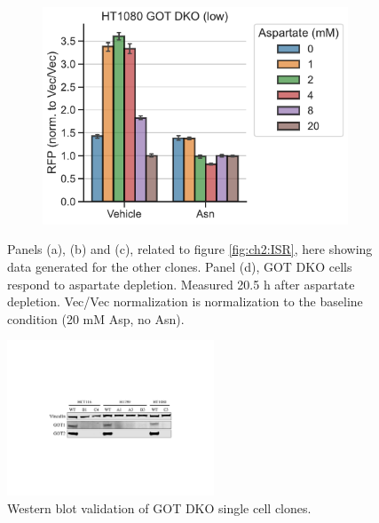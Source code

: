 \begin{figure}[ht]
\begin{subfigure}[b]{0.4\textwidth}
         \caption{}
         \label{fig:app_ch2:HT1080_Atp_ATF4rep}
     \end{subfigure}
     \hspace{0.06\textwidth}
     \begin{subfigure}[b]{0.4\textwidth}
         \includegraphics[width=\textwidth]{figures/chap2/app/HT1080_GOT_DKO_Asp_ATF4rep.pdf}
         \caption{}
         \label{fig:app_ch2:HT1080_GOT_DKO_Asp_ATF4rep}
     \end{subfigure}
        \caption[Mito inhibitor induced ATF4 is rescued by Asn, other clones.]{
        Panels (a), (b) and (c), related to figure \ref{fig:ch2:ISR}, here showing data generated for the other clones.
        Panel (d), GOT DKO cells respond to aspartate depletion.
        Measured 20.5 h after aspartate depletion.
        Vec/Vec normalization is normalization to the baseline condition (20 mM Asp, no Asn).
        }
        \label{fig:app_ch2:ISR}
\end{figure}

\begin{figure}[ht]
    \centering
    \includegraphics[width=0.55\textwidth]{figures/chap2/app/GOT_DKO_western.pdf}
    \caption[GOT DKO western blot validation.]{
    Western blot validation of GOT DKO single cell clones.
    }
    \label{fig:app_ch2:GOT_DKO_western}
\end{figure}



